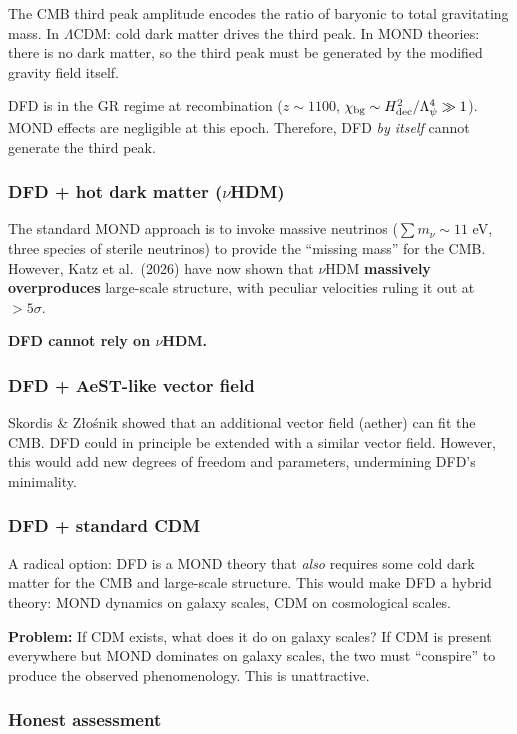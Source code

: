 \documentclass[11pt,a4paper]{article}
\begin{document}
The CMB third peak amplitude encodes the ratio of baryonic to total gravitating mass. In $\Lambda$CDM: cold dark matter drives the third peak. In MOND theories: there is no dark matter, so the third peak must be generated by the modified gravity field itself.

DFD is in the GR regime at recombination ($z \sim 1100$, $\chi_{\rm bg} \sim H_{\rm dec}^2/\Lambda_\psi^4 \gg 1$). MOND effects are negligible at this epoch. Therefore, DFD \emph{by itself} cannot generate the third peak.

\subsubsection{DFD + hot dark matter ($\nu$HDM)}

The standard MOND approach is to invoke massive neutrinos ($\sum m_\nu \sim 11$ eV, three species of sterile neutrinos) to provide the ``missing mass'' for the CMB. However, Katz et al.\ (2026) have now shown that $\nu$HDM \textbf{massively overproduces} large-scale structure, with peculiar velocities ruling it out at $> 5\sigma$.

\textbf{DFD cannot rely on $\nu$HDM.}

\subsubsection{DFD + AeST-like vector field}

Skordis \& Z\l o\'snik showed that an additional vector field (aether) can fit the CMB. DFD could in principle be extended with a similar vector field. However, this would add new degrees of freedom and parameters, undermining DFD's minimality.

\subsubsection{DFD + standard CDM}

A radical option: DFD is a MOND theory that \emph{also} requires some cold dark matter for the CMB and large-scale structure. This would make DFD a hybrid theory: MOND dynamics on galaxy scales, CDM on cosmological scales.

\textbf{Problem:} If CDM exists, what does it do on galaxy scales? If CDM is present everywhere but MOND dominates on galaxy scales, the two must ``conspire'' to produce the observed phenomenology. This is unattractive.

\subsubsection{Honest assessment}
\end{document}
